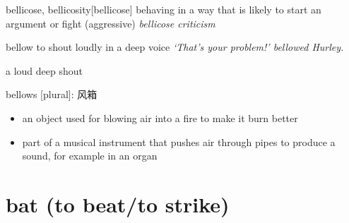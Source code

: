 \begin{DefWord}{bellicose, bellicosity}[bellicose]
    behaving in a way that is likely to start an argument or fight
    (aggressive)
    \textit{bellicose criticism}

\end{DefWord}

\begin{DefWord}{bellow}
    to shout loudly in a deep voice 
    \textit{‘That's your problem!' bellowed Hurley.}

    a loud deep shout

    bellows [plural]: 风箱
\begin{itemize}
    \item an object used for blowing air into a fire to make it burn better
    \item part of a musical instrument that pushes air through pipes to produce a sound, for example in an organ
\end{itemize}

\end{DefWord}


\section{bat (to beat/to strike)}


